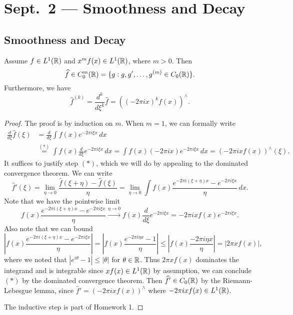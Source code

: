 \chapter{Sept.~2 --- Smoothness and Decay}

\section{Smoothness and Decay}

\begin{theorem}
  Assume $f \in L^1(\mathbb{R})$ and
  $x^m f(x) \in L^1(\mathbb{R})$, where $m > 0$.
  Then
  \[
    \widehat{f}
    \in C_0^m(\mathbb{R})
    = \{
      g : g, g', \dots, g^{(m)} \in C_0(\mathbb{R})
    \}.
  \]
  Furthermore, we have
  \[
    \widehat{f}^{(k)}
    = \frac{d^k}{d\xi^k} \widehat{f}
    = \left((-2\pi i x)^k f(x)\right)^\wedge.
  \]
\end{theorem}

\begin{proof}
  The proof is by induction on $m$.
  When $m = 1$, we can formally write
  \begin{align*}
    \frac{d}{d\xi} \widehat{f}(\xi)
    &= \frac{d}{d\xi} \int f(x) e^{-2\pi i \xi x} \, dx \\
    &\overset{(*)}{=} \int f(x) \frac{d}{d\xi} e^{-2\pi i \xi x} \, dx
    = \int f(x) (-2\pi i x) e^{-2\pi i \xi x} \, dx
    = (-2\pi i x f(x))^\wedge(\xi).
  \end{align*}
  It suffices to justify step $(*)$, which
  we will do by appealing to the
  dominated convergence theorem. We
  can write
  \[
    \widehat{f}'(\xi)
    = \lim_{\eta \to 0} \frac{\widehat{f}(\xi + \eta) - \widehat{f}(\xi)}{\eta}
    = \lim_{\eta \to 0} \int f(x) \frac{e^{-2\pi i (\xi + \eta) x} - e^{-2\pi i \xi x}}{\eta}\, dx.
  \]
  Note that we have the pointwise limit
  \[
    f(x) \frac{e^{-2\pi i (\xi + \eta) x} - e^{-2\pi i \xi x}}{\eta}
    \xrightarrow{\eta \to 0}
    f(x) \frac{d}{d\xi} e^{-2\pi i \xi x}
    = -2\pi i x f(x) e^{-2\pi i \xi x}.
  \]
  Also note that we can bound
  \[
    \left|f(x) \frac{e^{-2\pi i (\xi + \eta) x} - e^{-2\pi i \xi x}}{\eta}\right|
    = \left|f(x) \frac{e^{-2\pi i \eta x} - 1}{\eta}\right|
    \le \left|f(x) \frac{-2\pi i \eta x}{\eta}\right|
    = |2\pi x f(x)|,
  \]
  where we noted that $|e^{i\theta} - 1| \le |\theta|$ for $\theta \in \mathbb{R}$.
  Thus $2\pi x f(x)$ dominates the
  integrand and is integrable since
  $x f(x) \in L^1(\mathbb{R})$ by assumption,
  we can conclude $(*)$ by the dominated
  convergence theorem. Then
  $\widehat{f}' \in C_0(\mathbb{R})$ by the
  Riemann-Lebesgue lemma, since
  $\widehat{f}' = (-2\pi i x f(x))^\wedge$
  where $-2\pi i x f(x) \in L^1(\mathbb{R})$.

  The inductive step is part of Homework 1.
\end{proof}

